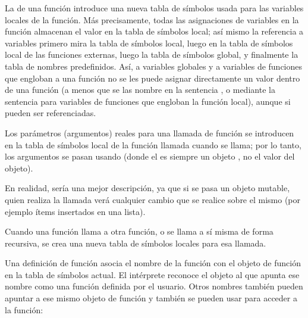 \documentclass[a5paper,10pt,spanish]{sphinxmanual}
\begin{document}
\sphinxAtStartPar
La  de una función introduce una nueva tabla de símbolos usada para las variables locales de la función. Más precisamente, todas las asignaciones de variables en la función almacenan el valor en la tabla de símbolos local; así mismo la referencia a variables primero mira la tabla de símbolos local, luego en la tabla de símbolos local de las funciones externas, luego la tabla de símbolos global, y finalmente la tabla de nombres predefinidos. Así, a variables globales y a variables de funciones que engloban a una función no se les puede asignar directamente un valor dentro de una función (a menos que se las nombre en la sentencia , o mediante la sentencia  para variables de funciones que engloban la función local), aunque si pueden ser referenciadas.

\sphinxAtStartPar
Los parámetros (argumentos) reales para una llamada de función se introducen en la tabla de símbolos local de la función llamada cuando se llama; por lo tanto, los argumentos se pasan usando  (donde el  es siempre un objeto , no el valor del objeto). %
\begin{footnote}[1]\sphinxAtStartFootnote
En realidad,  sería una mejor descripción, ya que si se pasa un objeto mutable, quien realiza la llamada verá cualquier cambio que se realice sobre el mismo (por ejemplo ítems insertados en una lista).
%
\end{footnote} Cuando una función llama a otra función, o se llama a sí misma de forma recursiva, se crea una nueva tabla de símbolos locales para esa llamada.

\sphinxAtStartPar
Una definición de función asocia el nombre de la función con el objeto de función en la tabla de símbolos actual. El intérprete reconoce el objeto al que apunta ese nombre como una función definida por el usuario. Otros nombres también pueden apuntar a ese mismo objeto de función y también se pueden usar para acceder a la función:

\begin{sphinxVerbatim}[commandchars=\\\{\}]
  
\end{sphinxVerbatim}
\end{document}
